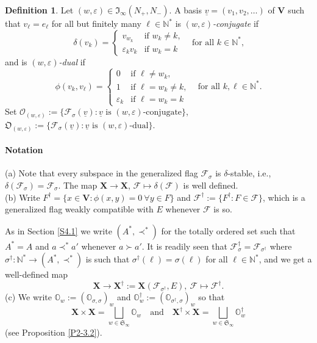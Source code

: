 \documentclass{amsart}
\theoremstyle{definition}
\newtheorem{definition}{Definition}
\newcommand{\NN}{\mathbb{N}^*}
\newcommand{\bs}[1]{\boldsymbol{#1}}
\begin{document}
\begin{definition}
Let $(w,\varepsilon)\in\mathfrak{I}_\infty(N_+,N_-)$.
A basis $\underline{v}=(v_1,v_2,\ldots)$ of $\mathbf{V}$ such that $v_\ell=e_\ell$ for all but finitely many $\ell\in\NN$ is {\em $(w,\varepsilon)$-conjugate} if
\[\delta(v_k)=\left\{
\begin{array}{ll}
v_{w_k} & \mbox{if $w_k\not=k$,} \\
\varepsilon_kv_k & \mbox{if $w_k=k$}
\end{array}
\right.
\quad\mbox{for all $k\in\NN$,}\]
and is {\em $(w,\varepsilon)$-dual} if
\[
\phi(v_k,v_\ell)=\left\{
\begin{array}{ll}
0 & \mbox{if $\ell\not=w_k$,} \\
1 & \mbox{if $\ell=w_k\not=k$,} \\
\varepsilon_k & \mbox{if $\ell=w_k=k$}
\end{array}
\right.
\quad\mbox{for all $k,\ell\in\NN$}.
\]
Set
$\bs{\mathcal{O}}_{(w,\varepsilon)}:=\{\mathcal{F}_\sigma(\underline{v}):\mbox{$\underline{v}$ is $(w,\varepsilon)$-conjugate}\}$, $\bs{\mathfrak{O}}_{(w,\varepsilon)}:=\{\mathcal{F}_\sigma(\underline{v}):\mbox{$\underline{v}$ is $(w,\varepsilon)$-dual}\}$.

\end{definition}

\paragraph{\bf Notation}
{\rm (a)} Note that every subspace in the generalized flag $\mathcal{F}_\sigma$ is $\delta$-stable, i.e., $\delta(\mathcal{F}_\sigma)=\mathcal{F}_\sigma$.
The map $\mathbf{X}\to\mathbf{X}$, $\mathcal{F}\mapsto\delta(\mathcal{F})$ is well defined.
\\
{\rm (b)} Write $F^\dag=\{x\in\mathbf{V}:\phi(x,y)=0\ \forall y\in F\}$ and
$\mathcal{F}^\dag:=\{F^\dag:F\in \mathcal{F}\}$, which is a generalized flag weakly compatible with $E$ whenever $\mathcal{F}$ is so.

As in Section \ref{S4.1} we write $(A^*,\prec^*)$ for the totally ordered set
such that $A^*=A$ and $a\prec^*a'$ whenever $a\succ a'$.
It is readily seen that $\mathcal{F}_\sigma^\dag=\mathcal{F}_{\sigma^\dag}$
where $\sigma^\dag:\NN\to(A^*,\prec^*)$ is such that $\sigma^\dag(\ell)=\sigma(\ell)$ for all $\ell\in\NN$, and we get a well-defined map
\[\mathbf{X}\to\mathbf{X}^\dag:=\mathbf{X}(\mathcal{F}_{\sigma^\dag},E),\ \mathcal{F}\mapsto\mathcal{F}^\dag.\]
{\rm (c)}
We write $\pmb{\mathbb{O}}_w:=(\pmb{\mathbb{O}}_{\sigma,\sigma})_w$ and
$\pmb{\mathbb{O}}_w^\dag:=(\pmb{\mathbb{O}}_{\sigma^\dag,\sigma})_w$ so that
\[\mathbf{X}\times\mathbf{X}=\bigsqcup_{w\in\mathfrak{S}_\infty}\pmb{\mathbb{O}}_w
\quad\mbox{and}\quad
\mathbf{X}^\dag\times\mathbf{X}=\bigsqcup_{w\in\mathfrak{S}_\infty}\pmb{\mathbb{O}}^\dag_w
\]
(see Proposition \ref{P2-3.2}).
\end{document}
